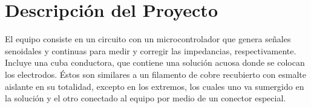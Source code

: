 \section{Descripción del Proyecto}
El equipo consiste en un circuito con un microcontrolador que genera señales senoidales y continuas para medir y corregir las impedancias, respectivamente. Incluye una cuba conductora, que contiene una solución acuosa donde se colocan los electrodos. Éstos son similares a un filamento de cobre recubierto con esmalte aislante en su totalidad, excepto en los extremos, los cuales uno va sumergido en la solución y el otro conectado al equipo por medio de un conector especial.

